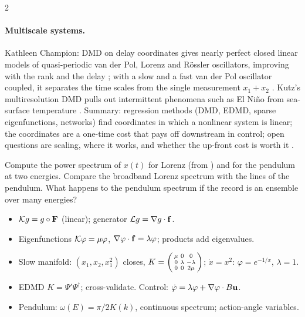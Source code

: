 \begin{paracol}{2}
\paragraph{Multiscale systems.} Kathleen Champion: DMD on delay coordinates gives nearly perfect closed linear
models of quasi-periodic van der Pol, Lorenz and R\"ossler oscillators, improving with the rank and the delay
; with a slow and a fast van der Pol oscillator coupled, it separates the
time scales from the single measurement $x_1+x_2$ . Kutz's multiresolution DMD pulls
out intermittent phenomena such as El Ni\~no from sea-surface temperature .
Summary: regression methods (DMD, EDMD, sparse eigenfunctions, networks) find coordinates in which a nonlinear
system is linear; the coordinates are a one-time cost that pays off downstream in control; open questions are
scaling, where it works, and whether the up-front cost is worth it .

\begin{exercise}
Compute the power spectrum of $x(t)$ for Lorenz (from ) and for the pendulum at two energies.
Compare the broadband Lorenz spectrum with the lines of the pendulum. What happens to the pendulum spectrum if
the record is an ensemble over many energies?
\end{exercise}

\begin{keyformulas}
\begin{itemize}
  \item $\mathcal{K} g=g\circ\mathbf{F}$ (linear); generator $\mathcal Lg=\nabla g\cdot\mathbf{f}$.
  \item Eigenfunctions $\mathcal{K}\varphi=\mu\varphi$, $\nabla\varphi\cdot\mathbf{f}=\lambda\varphi$; products add eigenvalues.
  \item Slow manifold: $(x_1,x_2,x_1^2)$ closes, $K=\begin{psmallmatrix}\mu&0&0\\0&\lambda&-\lambda\\0&0&2\mu\end{psmallmatrix}$;
        $\dot x=x^2$: $\varphi=e^{-1/x}$, $\lambda=1$.
  \item EDMD $K=\Psi'\Psi^\dagger$; cross-validate. Control: $\dot\varphi=\lambda\varphi+\nabla\varphi\cdot B\mathbf{u}$.
  \item Pendulum: $\omega(E)=\pi/2K(k)$, continuous spectrum; action-angle variables.
\end{itemize}
\end{keyformulas}

\end{paracol}
